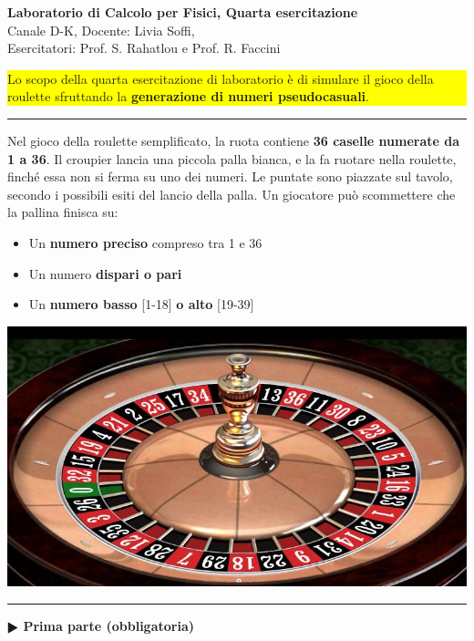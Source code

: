 \documentclass[12pt]{article}
\begin{document}
\pagestyle{empty}

\begin{center}
{\Large \bf  Laboratorio di Calcolo per Fisici, Quarta esercitazione\\[2mm]}
{\large Canale D-K, Docente: Livia Soffi, \\Esercitatori: Prof. S. Rahatlou e Prof. R. Faccini}
\end{center}
\vspace{4mm}

\colorbox{yellow}{\begin{minipage}{17cm}
  Lo scopo della quarta esercitazione di laboratorio \`e di simulare il gioco della roulette sfruttando la \textbf{generazione di numeri pseudocasuali}.
\end{minipage}}
\vspace{2mm}
%
%

\hrule
\vspace{2mm}
Nel gioco della roulette semplificato, la ruota contiene \textbf{36 caselle numerate da 1 a 36}. Il croupier lancia una piccola palla bianca, e la fa ruotare nella roulette, finché essa non si ferma su uno dei numeri. Le puntate sono piazzate sul tavolo, secondo i possibili esiti del lancio della palla. Un giocatore pu\`o scommettere che la pallina finisca su:

\begin{minipage}{10cm}
\vspace{2mm}
\begin{itemize}
\item Un \textbf{numero preciso} compreso tra 1 e 36
\item Un numero \textbf{dispari o pari}
\item Un \textbf{numero basso} [1-18] \textbf{o alto} [19-39]
\end{itemize}
 \end{minipage}
    \begin{minipage}{0.5\textwidth}
        \begin{center}
        \includegraphics[scale=0.2]{roulette.jpg}
        \end{center}
    \end{minipage}
 \vspace{2mm}  
\hrule
\vspace{2mm}
\textbf{$\RHD$ Prima parte (obbligatoria)} 
\vspace{2mm}
\end{document}

